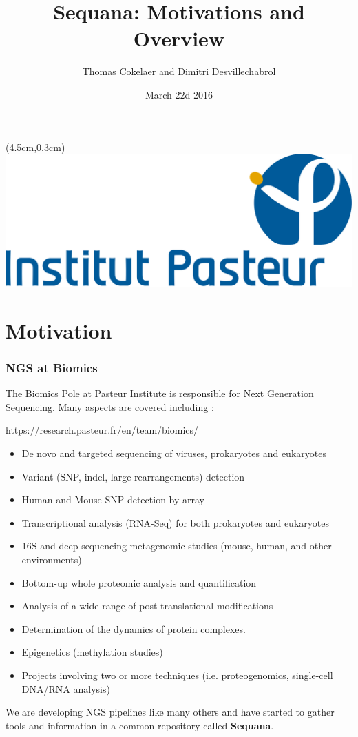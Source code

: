\documentclass{beamer}
\title{Sequana: Motivations and Overview}
\author[T.Cokelaer \& D.Desvillechabrol]{Thomas Cokelaer and Dimitri Desvillechabrol}
\institute{Institut Pasteur}
\date{March 22d 2016}
\begin{document}

\begin{frame}[plain]
    \titlepage
    \begin{textblock*}{5cm}(4.5cm,0.3cm)
        \includegraphics[scale=0.09]{Institut_Pasteur.png}
    \end{textblock*}
\end{frame}


\section{Motivation}

\begin{frame}
 \frametitle{NGS at Biomics}
 
 The Biomics Pole at Pasteur Institute is responsible for Next Generation Sequencing. Many aspects are covered including :
 
 \tiny
 \begin{block}{https://research.pasteur.fr/en/team/biomics/}
  \begin{itemize}
  \item De novo and targeted sequencing of viruses, prokaryotes and eukaryotes
  \item Variant (SNP, indel, large rearrangements) detection
  \item Human and Mouse SNP detection by array
  \item Transcriptional analysis (RNA-Seq) for both prokaryotes and eukaryotes
  \item 16S and deep-sequencing metagenomic studies (mouse, human, and other environments)
  \item Bottom-up whole proteomic analysis and quantification
  \item Analysis of a wide range of post-translational modifications
  \item Determination of the dynamics of protein complexes.
  \item Epigenetics (methylation studies)
  \item Projects involving two or more techniques (i.e. proteogenomics, single-cell DNA/RNA analysis)
  \end{itemize}
 \end{block}
 \small 
\pause
 We are developing NGS pipelines like many others and have started to gather
tools and information in a common repository called \textbf{Sequana}.
\end{frame}
\end{document}
